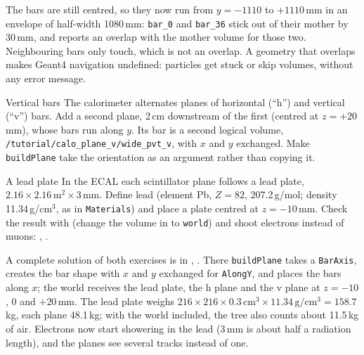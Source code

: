 \begin{solution}
The bars are still centred, so they now run from $y=-1110$ to $+1110$\,mm in
an envelope of half-width 1080\,mm: \texttt{bar\_0} and \texttt{bar\_36}
stick out of their mother by 30\,mm, and  reports an
overlap with the mother volume for those two. Neighbouring bars only touch,
which is not an overlap. A geometry that overlaps makes Geant4 navigation
undefined: particles get stuck or skip volumes, without any error message.
\end{solution}

\begin{exercise}{Vertical bars}
\label{ex:vbars}
The calorimeter alternates planes of horizontal (``h'') and vertical (``v'')
bars. Add a second plane, 2\,cm downstream of the first (centred at
$z=+20$\,mm), whose bars run along $y$. Its bar is a second logical volume,
\texttt{/tutorial/calo\_plane\_v/wide\_pvt\_v}, with $x$ and $y$ exchanged.
Make \texttt{buildPlane} take the orientation as an argument rather than
copying it.
\end{exercise}

\begin{exercise}{A lead plate}
\label{ex:lead}
In the ECAL each scintillator plane follows a lead plate,
$2.16\times2.16\,\mathrm{m}^2\times3$\,mm. Define lead (element Pb, $Z=82$,
207.2\,g/mol; density 11.34\,g/cm$^3$, as in \texttt{Materials}) and place a
plate centred at $z=-10$\,mm. Check the result with 
(change the volume in  to \texttt{world}) and shoot
electrons instead of muons: , .
\end{exercise}

\begin{solution}
A complete solution of both exercises is in ,
. There \texttt{buildPlane}
takes a \texttt{BarAxis}, creates the bar shape with $x$ and $y$ exchanged for
\texttt{AlongY}, and places the bars along $x$; the world receives the lead
plate, the h plane and the v plane at $z=-10$, $0$ and $+20$\,mm. The lead
plate weighs $216\times216\times0.3\,\mathrm{cm}^3\times11.34\,\mathrm{g/cm^3}
=158.7$\,kg, each plane 48.1\,kg; with the world included, the tree also
counts about 11.5\,kg of air. Electrons now start showering in the lead (3\,mm
is about half a radiation length), and the planes see several tracks instead
of one.
\end{solution}

